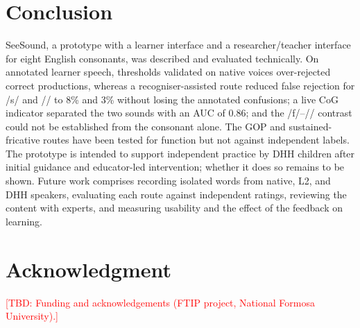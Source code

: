\documentclass[conference]{IEEEtran}
\newcommand{\tbd}[1]{\textcolor{red}{[TBD: #1]}}
\newcommand{\ipa}[1]{/#1/}
\begin{document}
\section{Conclusion}
SeeSound, a prototype with a learner interface and a researcher/teacher interface for eight English consonants, was described and evaluated technically. On annotated learner speech, thresholds validated on native voices over-rejected correct productions, whereas a recogniser-assisted route reduced false rejection for \ipa{s} and \ipa{\textesh} to 8\% and 3\% without losing the annotated confusions; a live CoG indicator separated the two sounds with an AUC of 0.86; and the \ipa{f}--\ipa{\texttheta} contrast could not be established from the consonant alone. The GOP and sustained-fricative routes have been tested for function but not against independent labels. The prototype is intended to support independent practice by DHH children after initial guidance and educator-led intervention; whether it does so remains to be shown. Future work comprises recording isolated words from native, L2, and DHH speakers, evaluating each route against independent ratings, reviewing the content with experts, and measuring usability and the effect of the feedback on learning.

\section*{Acknowledgment}
\tbd{Funding and acknowledgements (FTIP project, National Formosa University).}
\end{document}
